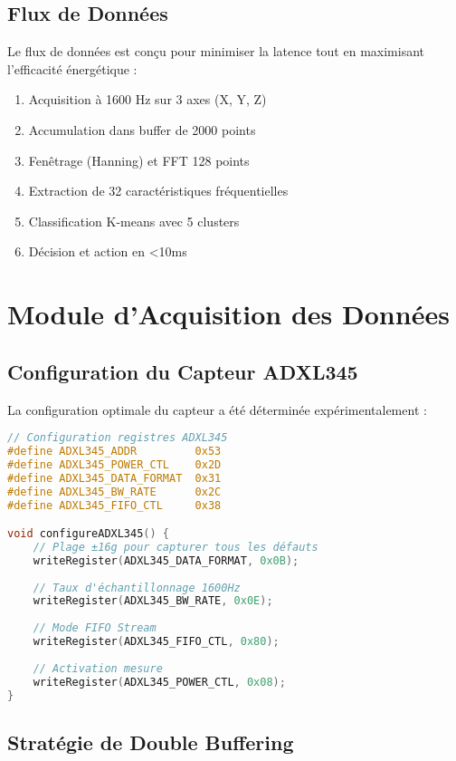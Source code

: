 \subsection{Flux de Données}

Le flux de données est conçu pour minimiser la latence tout en maximisant l'efficacité énergétique :

\begin{enumerate}
    \item Acquisition à 1600 Hz sur 3 axes (X, Y, Z)
    \item Accumulation dans buffer de 2000 points
    \item Fenêtrage (Hanning) et FFT 128 points
    \item Extraction de 32 caractéristiques fréquentielles
    \item Classification K-means avec 5 clusters
    \item Décision et action en <10ms
\end{enumerate}

\section{Module d'Acquisition des Données}

\subsection{Configuration du Capteur ADXL345}

La configuration optimale du capteur a été déterminée expérimentalement :

\begin{lstlisting}[language=C, caption=Configuration ADXL345]
// Configuration registres ADXL345
#define ADXL345_ADDR         0x53
#define ADXL345_POWER_CTL    0x2D
#define ADXL345_DATA_FORMAT  0x31
#define ADXL345_BW_RATE      0x2C
#define ADXL345_FIFO_CTL     0x38

void configureADXL345() {
    // Plage ±16g pour capturer tous les défauts
    writeRegister(ADXL345_DATA_FORMAT, 0x0B);
    
    // Taux d'échantillonnage 1600Hz
    writeRegister(ADXL345_BW_RATE, 0x0E);
    
    // Mode FIFO Stream
    writeRegister(ADXL345_FIFO_CTL, 0x80);
    
    // Activation mesure
    writeRegister(ADXL345_POWER_CTL, 0x08);
}
\end{lstlisting}

\subsection{Stratégie de Double Buffering}

